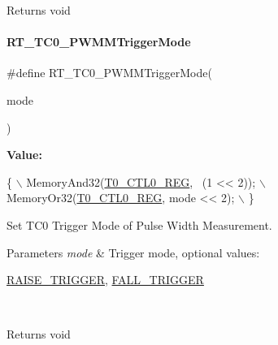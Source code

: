 \begin{DoxyReturn}{Returns}
void 
\end{DoxyReturn}
\mbox{\label{a00137_a48f8c6b4e5fba0057564f92060449557}} 
\paragraph{\texorpdfstring{R\+T\+\_\+\+T\+C0\+\_\+\+P\+W\+M\+M\+Trigger\+Mode}{RT\_TC0\_PWMMTriggerMode}}
{\footnotesize\ttfamily \#define R\+T\+\_\+\+T\+C0\+\_\+\+P\+W\+M\+M\+Trigger\+Mode(\begin{DoxyParamCaption}\item[{}]{mode }\end{DoxyParamCaption})}

{\bfseries Value\+:}
\begin{DoxyCode}
\{                                        \(\backslash\)
        MemoryAnd32(\mbox{\hyperlink{a00068_ac94b0659ef32086a6752672082c0b3ed}{T0\_CTL0\_REG}}, ~(1 << 2)); \(\backslash\)
        MemoryOr32(\mbox{\hyperlink{a00068_ac94b0659ef32086a6752672082c0b3ed}{T0\_CTL0\_REG}}, mode << 2);  \(\backslash\)
    \}
\end{DoxyCode}


Set T\+C0 Trigger Mode of Pulse Width Measurement. 


\begin{DoxyParams}{Parameters}
{\em mode} & Trigger mode, optional values\+:
\begin{DoxyCode}
\mbox{\hyperlink{a00068_abda90eda34a640b130f48a6ade23fe22}{RAISE\_TRIGGER}}, \mbox{\hyperlink{a00068_a9bbaf5b9e2125c7597249c7113b20e6c}{FALL\_TRIGGER}}
\end{DoxyCode}
 \\
\hline
\end{DoxyParams}
\begin{DoxyReturn}{Returns}
void 
\end{DoxyReturn}
\mbox{\label{a00137_a043d535ff9aad665ddf1521169a0f187}} 
